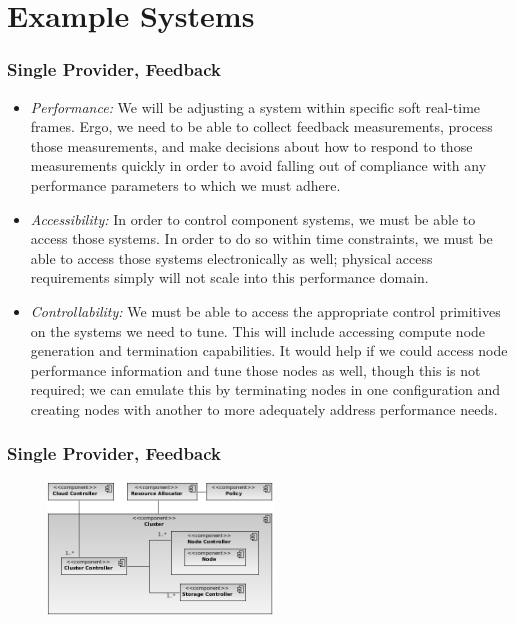 \documentclass[t, 10pt]{beamer}
\begin{document}
\section{Example Systems}
\begin{frame}
\frametitle{Single Provider, Feedback}

\begin{itemize}
\item \textit{Performance:} We will be adjusting a system within specific soft real-time frames.  Ergo, we need to be able to collect feedback measurements, process those measurements, and make decisions about how to respond to those measurements quickly in order to avoid falling out of compliance with any performance parameters to which we must adhere.
\item \textit{Accessibility:} In order to control component systems, we must be able to access those systems.  In order to do so within time constraints, we must be able to access those systems electronically as well; physical access requirements simply will not scale into this performance domain.
\item \textit{Controllability:} We must be able to access the appropriate control primitives on the systems we need to tune.  This will include accessing compute node generation and termination capabilities.  It would help if we could access node performance information and tune those nodes as well, though this is not required; we can emulate this by terminating nodes in one configuration and creating nodes with another to more adequately address performance needs.
\end{itemize}

\end{frame}

\begin{frame}
\frametitle{Single Provider, Feedback}

\begin{figure}
\includegraphics[width = 6cm]{Single-QoS}
\end{figure}

\end{frame}
\end{document}
